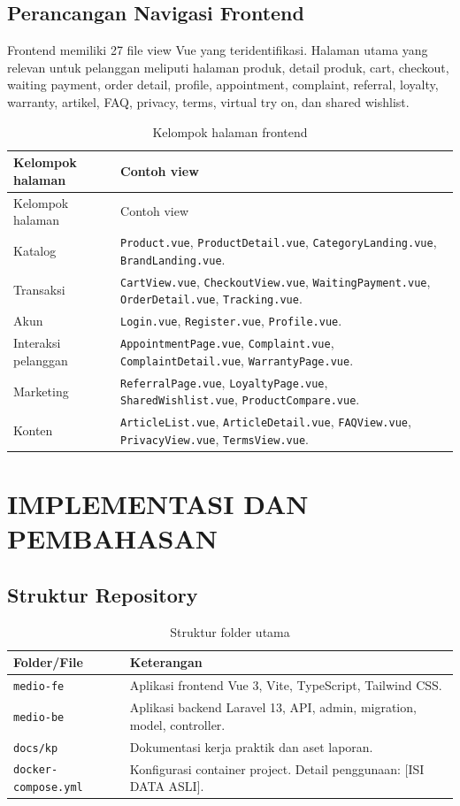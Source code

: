 \documentclass[12pt,a4paper]{report}
\begin{document}
\section{Perancangan Navigasi Frontend}
Frontend memiliki 27 file view Vue yang teridentifikasi. Halaman utama yang relevan untuk pelanggan meliputi halaman produk, detail produk, cart, checkout, waiting payment, order detail, profile, appointment, complaint, referral, loyalty, warranty, artikel, FAQ, privacy, terms, virtual try on, dan shared wishlist.

\begin{longtable}{p{}p{}}
\caption{Kelompok halaman frontend}\\
\toprule
Kelompok halaman & Contoh view \\
\midrule
\endfirsthead
\toprule
Kelompok halaman & Contoh view \\
\midrule
\endhead
Katalog & \texttt{Product.vue}, \texttt{ProductDetail.vue}, \texttt{CategoryLanding.vue}, \texttt{BrandLanding.vue}. \\
Transaksi & \texttt{CartView.vue}, \texttt{CheckoutView.vue}, \texttt{WaitingPayment.vue}, \texttt{OrderDetail.vue}, \texttt{Tracking.vue}. \\
Akun & \texttt{Login.vue}, \texttt{Register.vue}, \texttt{Profile.vue}. \\
Interaksi pelanggan & \texttt{AppointmentPage.vue}, \texttt{Complaint.vue}, \texttt{ComplaintDetail.vue}, \texttt{WarrantyPage.vue}. \\
Marketing & \texttt{ReferralPage.vue}, \texttt{LoyaltyPage.vue}, \texttt{SharedWishlist.vue}, \texttt{ProductCompare.vue}. \\
Konten & \texttt{ArticleList.vue}, \texttt{ArticleDetail.vue}, \texttt{FAQView.vue}, \texttt{PrivacyView.vue}, \texttt{TermsView.vue}. \\
\bottomrule
\end{longtable}

\chapter{IMPLEMENTASI DAN PEMBAHASAN}
\section{Struktur Repository}
\begin{table}[H]
\centering
\caption{Struktur folder utama}
\begin{tabular}{p{}p{}}
\toprule
Folder/File & Keterangan \\
\midrule
\texttt{medio-fe} & Aplikasi frontend Vue 3, Vite, TypeScript, Tailwind CSS. \\
\texttt{medio-be} & Aplikasi backend Laravel 13, API, admin, migration, model, controller. \\
\texttt{docs/kp} & Dokumentasi kerja praktik dan aset laporan. \\
\texttt{docker-compose.yml} & Konfigurasi container project. Detail penggunaan: [ISI DATA ASLI]. \\
\bottomrule
\end{tabular}
\end{table}
\end{document}
